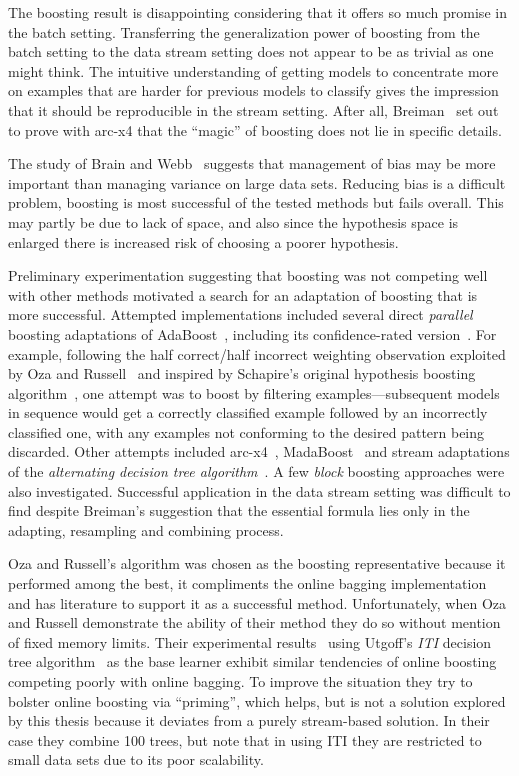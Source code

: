 The boosting result is disappointing considering that it offers so much promise in the batch setting. Transferring the generalization power of boosting from the batch setting to the data stream setting does not appear to be as trivial as one might think. The intuitive understanding of getting models to concentrate more on examples that are harder for previous models to classify gives the impression that it should be reproducible in the stream setting. After all, Breiman~\cite{arcing} set out to prove with arc-x4 that the ``magic'' of boosting does not lie in specific details.

The study of Brain and Webb~\cite{lowbiaslargeds} suggests that management of bias may be more important than managing variance on large data sets. Reducing bias is a difficult problem, boosting is most successful of
the tested methods but fails overall. This may partly be due to lack of space, and also since the hypothesis space is enlarged there is increased risk of choosing a poorer hypothesis.

Preliminary experimentation suggesting that boosting was not competing well with other methods motivated a search for an adaptation of boosting that is more successful. 
Attempted implementations included several direct {\em parallel} boosting adaptations of AdaBoost~\cite{adaboost}, including its confidence-rated version~\cite{boostimproved}. For example, following the half correct/half incorrect weighting observation exploited by Oza and Russell~\cite{ozabagboost} and inspired by Schapire's original hypothesis boosting algorithm~\cite{strength}, one attempt was to boost by filtering examples---subsequent models in sequence would get a correctly classified example followed by an incorrectly classified one, with any examples not conforming to the desired pattern being discarded. 
Other attempts included arc-x4~\cite{arcing}, MadaBoost~\cite{madaboost} and stream adaptations of the {\em alternating decision tree algorithm}~\cite{adtrees}. A few {\em block} boosting approaches were also investigated.
Successful application in the data stream setting was difficult to find despite Breiman's suggestion that the essential formula lies only in the adapting, resampling and combining process.

Oza and Russell's algorithm was chosen as the boosting representative because it performed among the best, it compliments the online bagging implementation and has literature to support it as a successful method. Unfortunately, when Oza and Russell demonstrate the ability of their method they do so without mention of fixed memory limits. Their experimental results~\cite{ozabagboost, ozaexp} using Utgoff's {\em ITI} decision tree algorithm~\cite{iti} as the base learner exhibit similar tendencies of online boosting competing poorly with online bagging. To improve the situation they try to bolster online boosting via ``priming'', which helps, but is not a solution explored by this thesis because it deviates from a purely stream-based solution. In their case they combine 100 trees, but note that in using ITI they are restricted to small data sets due to its poor scalability.

